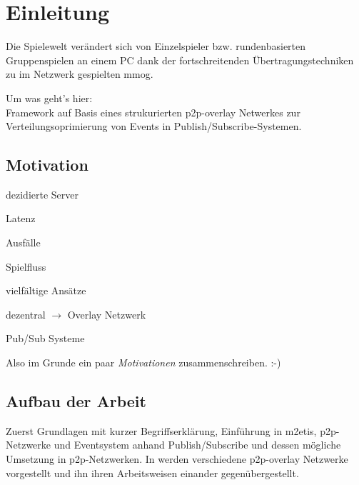 \chapter{Einleitung}
\label{chap:einleitung}

Die Spielewelt verändert sich von Einzelspieler bzw. rundenbasierten Gruppenspielen an einem PC dank der fortschreitenden Übertragungstechniken zu im Netzwerk gespielten \ac{mmog}.

Um was geht's hier:\\
Framework auf Basis eines strukurierten p2p-overlay Netwerkes zur Verteilungsoprimierung von Events in Publish/Subscribe-Systemen.

\section{Motivation}
\begin{itemize*}
\item dezidierte Server
\item Latenz
\item Ausfälle
\item Spielfluss
\end{itemize*}

\begin{itemize*}
\item vielfältige Ansätze \cite{Bharambe2008Donnybrook} %
\item dezentral $\rightarrow$ Overlay Netzwerk
\item Pub/Sub Systeme \cite{Knutsson2004Peertopeer, Triebel2008Peertopeer} %
\end{itemize*}

Also im Grunde ein paar \emph{Motivationen} zusammenschreiben. :-)

\cite{Fischer2010Event, Fischer2010a} %

\section{Aufbau der Arbeit}
Zuerst Grundlagen mit kurzer Begriffserklärung, Einführung in \ac{m2etis},  p2p-Netzwerke und Eventsystem anhand Publish/Subscribe und dessen mögliche Umsetzung in p2p-Netzwerken. In  werden verschiedene p2p-overlay Netzwerke vorgestellt und ihn ihren Arbeitsweisen einander gegenübergestellt.

